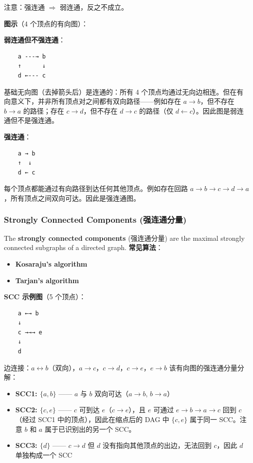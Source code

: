 \documentclass[10pt,a4paper,openany]{ctexbook}
\theoremstyle{definition}
\theoremstyle{remark}
\renewenvironment{quote}
  {\list{}{\leftmargin=1em\rightmargin=0pt\topsep=0.5pt\partopsep=0pt}\item[]}
  {\endlist}
\begin{document}
\begin{quote}
注意：强连通 $\Rightarrow$ 弱连通，反之不成立。

\textbf{图示}（4 个顶点的有向图）：

\textbf{弱连通但不强连通}：
{\footnotesize\begin{verbatim}
    a ---→ b
    ↑      ↓
    d ←--- c
\end{verbatim}}

基础无向图（去掉箭头后）是连通的：所有 4 个顶点均通过无向边相连。但在有向意义下，并非所有顶点对之间都有双向路径——例如存在 $a\to b$，但不存在 $b\to a$ 的路径；存在 $c\to d$，但不存在 $d\to c$ 的路径（仅 $d\leftarrow c$）。因此图是弱连通但不是强连通。

\textbf{强连通}：
{\footnotesize\begin{verbatim}
    a → b
    ↑  ↓
    d ← c
\end{verbatim}}

每个顶点都能通过有向路径到达任何其他顶点。例如存在回路 $a\to b\to c\to d\to a$，所有顶点之间双向可达。因此是强连通图。

\end{quote}

\subsubsection{Strongly Connected Components (强连通分量)}

The \textbf{strongly connected components} (强连通分量) are the maximal strongly connected subgraphs of a directed graph.
\textbf{常见算法}：
\begin{itemize}
\item \textbf{Kosaraju's algorithm}
\item \textbf{Tarjan's algorithm}

\end{itemize}

\textbf{SCC 示例图}（5 个顶点）：
{\footnotesize\begin{verbatim}
    a ←→ b
    ↓
    c →→→ e
    ↓
    d
\end{verbatim}}

边连接：$a\leftrightarrow b$（双向），$a\to c$，$c\to d$，$c\to e$，$e\to b$
该有向图的强连通分量分解：
\begin{itemize}
\item \textbf{SCC1: $\{a, b\}$} —— $a$ 与 $b$ 双向可达（$a\to b$, $b\to a$）
\item \textbf{SCC2: $\{c, e\}$} —— $c$ 可到达 $e$（$c\to e$），且 $e$ 可通过 $e\to b\to a\to c$ 回到 $c$（经过 SCC1 中的顶点），因此在缩点后的 DAG 中 $\{c,e\}$ 属于同一 SCC。注意 $b$ 和 $a$ 属于已识别出的另一个 SCC。
\item \textbf{SCC3: $\{d\}$} —— $c\to d$ 但 $d$ 没有指向其他顶点的出边，无法回到 $c$，因此 $d$ 单独构成一个 SCC

\end{itemize}
\end{document}
